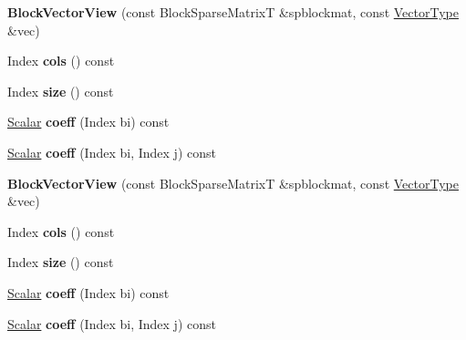 \begin{DoxyCompactItemize}
\item 
\mbox{\label{class_eigen_1_1_block_vector_view_a0049a3f79ea4a2759a923bcf970fe7c0}} 
{\bfseries Block\+Vector\+View} (const Block\+Sparse\+MatrixT \&spblockmat, const \hyperlink{struct_vector_type}{Vector\+Type} \&vec)
\item 
\mbox{\label{class_eigen_1_1_block_vector_view_a5ae5e8e8d65b063c276615de194d9454}} 
Index {\bfseries cols} () const
\item 
\mbox{\label{class_eigen_1_1_block_vector_view_a061acd7f57cbeacbd6406ee3820b12cd}} 
Index {\bfseries size} () const
\item 
\mbox{\label{class_eigen_1_1_block_vector_view_ad26a9609460326dde868cd1afa95adc8}} 
\hyperlink{group___core___module_class_eigen_1_1_ref}{Scalar} {\bfseries coeff} (Index bi) const
\item 
\mbox{\label{class_eigen_1_1_block_vector_view_af15f27ea3733e13e09f2344ff62150ed}} 
\hyperlink{group___core___module_class_eigen_1_1_ref}{Scalar} {\bfseries coeff} (Index bi, Index j) const
\item 
\mbox{\label{class_eigen_1_1_block_vector_view_a0049a3f79ea4a2759a923bcf970fe7c0}} 
{\bfseries Block\+Vector\+View} (const Block\+Sparse\+MatrixT \&spblockmat, const \hyperlink{struct_vector_type}{Vector\+Type} \&vec)
\item 
\mbox{\label{class_eigen_1_1_block_vector_view_a5ae5e8e8d65b063c276615de194d9454}} 
Index {\bfseries cols} () const
\item 
\mbox{\label{class_eigen_1_1_block_vector_view_a061acd7f57cbeacbd6406ee3820b12cd}} 
Index {\bfseries size} () const
\item 
\mbox{\label{class_eigen_1_1_block_vector_view_ad26a9609460326dde868cd1afa95adc8}} 
\hyperlink{group___core___module_class_eigen_1_1_ref}{Scalar} {\bfseries coeff} (Index bi) const
\item 
\mbox{\label{class_eigen_1_1_block_vector_view_af15f27ea3733e13e09f2344ff62150ed}} 
\hyperlink{group___core___module_class_eigen_1_1_ref}{Scalar} {\bfseries coeff} (Index bi, Index j) const
\end{DoxyCompactItemize}
